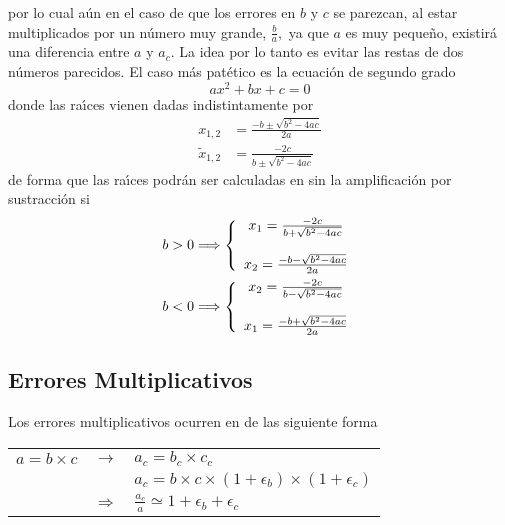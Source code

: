 \documentclass[spanish,titlepage,11pt]{article}
\begin{document}
por lo cual a\'{u}n en el caso de que los errores en $b$ y $c$ se parezcan, al
estar multiplicados por un n\'{u}mero muy grande, $\frac{b}{a},$ ya que $a $
es muy peque\~{n}o, existir\'{a} una diferencia entre $a$ y $a_{c}.$ La idea
por lo tanto es evitar las restas de dos n\'{u}meros parecidos. El caso
m\'{a}s pat\'{e}tico es la ecuaci\'{o}n de segundo grado
\begin{equation}
ax^{2}+bx+c=0
\end{equation}
donde las ra\'{\i}ces vienen dadas indistintamente por
\begin{align}
x_{1,2}  &  =\frac{-b\pm\sqrt{b^{2}-4ac}}{2a}\label{sintilde}\\
\tilde{x}_{1,2}  &  =\frac{-2c}{b\pm\sqrt{b^{2}-4ac}} \label{contilde}%
\end{align}
de forma que las ra\'{\i}ces podr\'{a}n ser calculadas en sin la
amplificaci\'{o}n por sustracci\'{o}n si
\begin{align}
b  &  >0\Longrightarrow\left\{
\begin{array}
[c]{c}%
x_{1}=\frac{-2c}{b+\sqrt{b^{2}-4ac}}\\
\\
x_{2}=\frac{-b-\sqrt{b^{2}-4ac}}{2a}%
\end{array}
\right. \\
b  &  <0\Longrightarrow\left\{
\begin{array}
[c]{c}%
x_{2}=\frac{-2c}{b-\sqrt{b^{2}-4ac}}\\
\\
x_{1}=\frac{-b+\sqrt{b^{2}-4ac}}{2a}%
\end{array}
\right.
\end{align}

\subsection{Errores Multiplicativos}

Los errores multiplicativos ocurren en de las siguiente forma

\begin{center}%
\begin{tabular}
[c]{lll}%
$a=b\times c$ & $\longrightarrow$ & $a_{c}=b_{c}\times c_{c}$\\
&  & $a_{c}=b\times c\times\left(  1+\epsilon_{b}\right)  \times\left(
1+\epsilon_{c}\right)  $\\
& $\Longrightarrow$ & $\frac{a_{c}}{a}\simeq1+\epsilon_{b}+\epsilon_{c}$%
\end{tabular}
\end{center}
\end{document}

